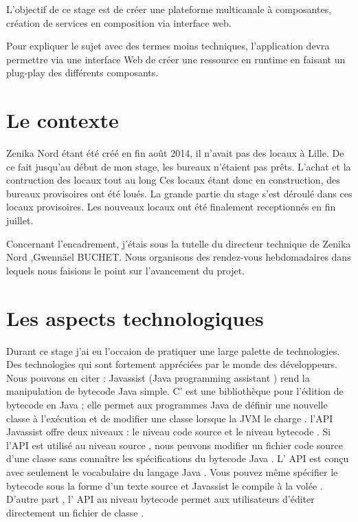 L'objectif de ce stage est de créer une plateforme multicanale à composantes, création de services en composition via interface web.

Pour expliquer le sujet avec des termes moins techniques, l'application devra permettre via une interface Web de créer une ressource en runtime en faisant un plug-play des différents composants.

\section{Le contexte}
\label{lecontexte}

Zenika Nord étant été créé en fin août 2014, il n'avait pas des locaux à Lille. De ce fait jusqu'au début de mon stage, les bureaux n'étaient pas prêts. L'achat et la contruction des locaux tout au long
 Ces locaux étant donc en construction, des bureaux provisoires ont été loués. La grande partie du stage s'est déroulé dans ces locaux provisoires. Les nouveaux locaux ont été finalement receptionnés en fin juillet.
 
 
 Concernant l'encadrement, j'étais sous la tutelle du directeur technique de Zenika Nord ,Gwennäel BUCHET. Nous organisons des rendez-vous hebdomadaires dans lequels nous faisions le point sur l'avancement du projet.

\section{Les aspects technologiques}
\label{lesaspectstechnologiques}

Durant ce stage j'ai eu l'occaion de pratiquer une large palette de technologies. Des technologies qui sont fortement appréciées par le monde des développeurs. Nous pouvons en citer : 
 Javassist (Java programming assistant ) rend la manipulation de bytecode Java simple. C' est une bibliothèque pour l'édition de bytecode en Java ; elle permet aux programmes Java de définir une nouvelle classe à l'exécution et de modifier une classe lorsque la JVM le charge . l'API Javassist offre deux niveaux : le niveau code source et le niveau bytecode . Si l'API est utilisé au niveau source , nous peuvons modifier un fichier code source d'une classe sans connaître les spécifications du bytecode Java . L' API est conçu avec seulement le vocabulaire du langage Java . Vous pouvez même spécifier le bytecode sous la forme d'un texte source et Javassist le compile à la volée . D'autre part , l' API au niveau bytecode permet aux utilisateurs d'éditer directement un fichier de classe .

